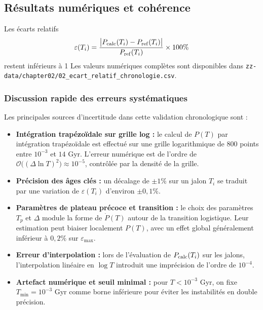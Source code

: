 \subsection{Résultats numériques et cohérence}

Les écarts relatifs  
\[
  \varepsilon(T_{i})
  = \frac{\bigl|P_{\rm calc}(T_{i}) - P_{\rm ref}(T_{i})\bigr|}
         {P_{\rm ref}(T_{i})}\times100\%
\]
restent inférieurs à 1 %
Les valeurs numériques complètes sont disponibles dans  
\texttt{zz-data/chapter02/02\_ecart\_relatif\_chronologie.csv}.

\subsubsection*{Discussion rapide des erreurs systématiques}

Les principales sources d’incertitude dans cette validation chronologique sont :

\begin{itemize}
  \item \textbf{Intégration trapézoïdale sur grille log :}  
    le calcul de \(P(T)\) par intégration trapézoïdale est effectué sur une grille logarithmique de 800 points entre \(10^{-3}\) et \(14\) Gyr.  
    L’erreur numérique est de l’ordre de \(\mathcal{O}\bigl((\Delta \ln T)^2\bigr)\approx10^{-5}\), contrôlée par la densité de la grille.

  \item \textbf{Précision des âges clés :}  
    un décalage de \(\pm1\%\) sur un jalon \(T_i\) se traduit par une variation de \(\varepsilon(T_i)\) d’environ \(\pm0{,}1\%\).

  \item \textbf{Paramètres de plateau précoce et transition :}  
    le choix des paramètres \(T_{p}\) et \(\Delta\) module la forme de \(\dot P(T)\) autour de la transition logistique.  
    Leur estimation peut biaiser localement \(P(T)\), avec un effet global généralement inférieur à \(0{,}2\%\) sur \(\varepsilon_{\max}\).

  \item \textbf{Erreur d’interpolation :}  
    lors de l’évaluation de \(P_{\rm calc}(T_i)\) sur les jalons, l’interpolation linéaire en \(\log T\) introduit une imprécision de l’ordre de \(10^{-4}\).

  \item \textbf{Artefact numérique et seuil minimal :}  
    pour \(T<10^{-3}\) Gyr, on fixe \(T_{\min}=10^{-3}\) Gyr comme borne inférieure pour éviter les instabilités en double précision.
\end{itemize}

